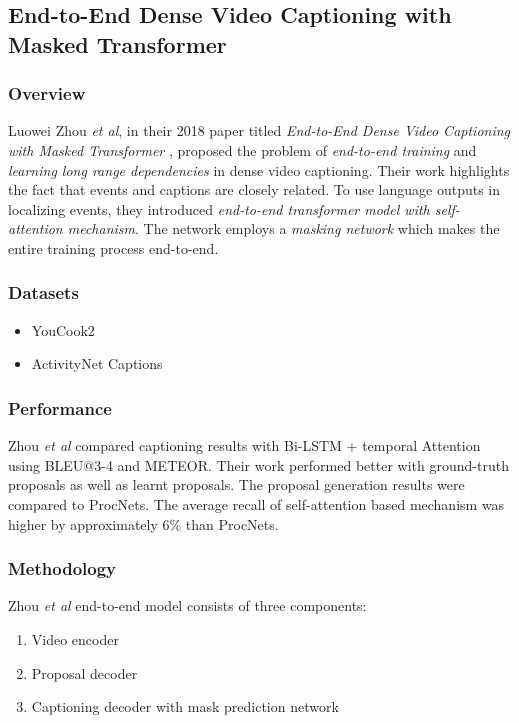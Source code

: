 \subsection{End-to-End Dense Video Captioning with Masked Transformer}

\subsubsection{Overview}

\par Luowei Zhou \textit{et al}, in their 2018 paper titled \textit{End-to-End Dense Video Captioning with Masked Transformer} \cite{zhou2018end}, proposed the problem of \textit{end-to-end training} and \textit{learning long range dependencies} in dense video captioning. Their work highlights the fact that events and captions are closely related. To use language outputs in localizing events, they introduced \textit{end-to-end transformer model with self-attention mechanism}. The network employs a \textit{masking network} which makes the entire training process end-to-end.


\subsubsection{Datasets}
\begin{itemize}
\item YouCook2
\item ActivityNet Captions
\end{itemize}

\subsubsection{Performance}
\par Zhou \textit{et al} compared captioning results with Bi-LSTM + temporal Attention\cite{yao2015describing} using BLEU@3-4 and METEOR. Their work performed better with ground-truth proposals as well as learnt proposals. The proposal generation results were compared to ProcNets\cite{zhou2017automatic}. The average recall of self-attention based mechanism was higher by approximately 6\% than ProcNets.


\subsubsection{Methodology}

\par Zhou \textit{et al} end-to-end model consists of three components:
\begin{enumerate}
	\item Video encoder
	\item Proposal decoder
	\item Captioning decoder with mask prediction network
\end{enumerate}

